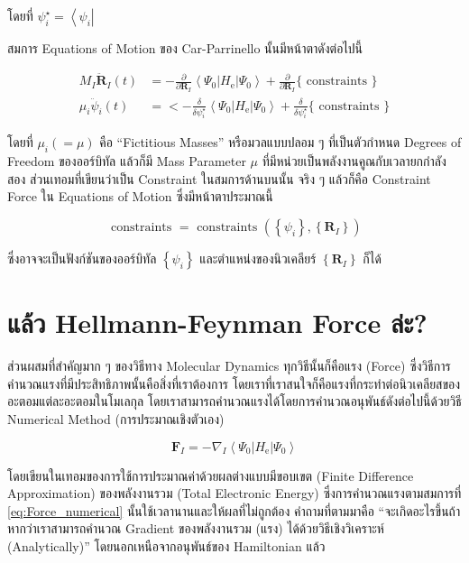 \noindent โดยที่ $\psi_i^{\star}=\left\langle\psi_i\right|$

สมการ Equations of Motion ของ Car-Parrinello นั้นมีหน้าตาดังต่อไปนี้


\begin{align}
  M_I \ddot{\mathbf{R}}_I(t)
   & =
  -\frac{\partial}{\partial \mathbf{R}_I}\left\langle\Psi_0\left| H_{\mathrm{e}}\right| \Psi_0\right\rangle
  +\frac{\partial}{\partial \mathbf{R}_I}\{\text{ constraints }\} \\
  \mu_i \ddot{\psi}_i(t)
   & =
  <-\frac{\delta}{\delta \psi_i^{\star}}\left\langle\Psi_0\left| H_{\mathrm{e}}\right| \Psi_0\right\rangle
  +\frac{\delta}{\delta \psi_i^{\star}}\{\text{ constraints }\}
\end{align}

\noindent โดยที่ $\mu_i(=\mu)$ คือ \enquote{Fictitious Masses} หรือมวลแบบปลอม ๆ ที่เป็นตัวกำหนด Degrees of Freedom
ของออร์บิทัล แล้วก็มี Mass Parameter $\mu$ ที่มีหน่วยเป็นพลังงานคูณกับเวลายกกำลังสอง ส่วนเทอมที่เขียนว่าเป็น Constraint ในสมการด้านบนนั้น
จริง ๆ แล้วก็คือ Constraint Force ใน Equations of Motion ซึ่งมีหน้าตาประมาณนี้

\begin{equation}
  \text{ constraints }
  =
  \text{ constraints }\left(\left\{\psi_i\right\},\left\{\mathbf{R}_I\right\}\right)
\end{equation}

\noindent ซึ่งอาจจะเป็นฟังก์ชันของออร์บิทัล $\left\{\psi_i\right\}$ และตำแหน่งของนิวเคลียร์ $\left\{\mathbf{R}_I\right\}$ ก็ได้

\section{แล้ว Hellmann-Feynman Force ล่ะ?}

ส่วนผสมที่สำคัญมาก ๆ ของวิธีทาง Molecular Dynamics ทุกวิธีนั้นก็คือแรง (Force) ซึ่งวิธีการคำนวณแรงที่มีประสิทธิภาพนั้นคือสิ่งที่เราต้องการ
โดยเราที่เราสนใจก็คือแรงที่กระทำต่อนิวเคลียสของอะตอมแต่ละอะตอมในโมเลกุล โดยเราสามารถคำนวณแรงได้โดยการคำนวณอนุพันธ์ดังต่อไปนี้ด้วยวิธี
Numerical Method (การประมาณเชิงตัวเอง)

\begin{equation}
  \label{eq:Force_numerical}
  \mathbf{F}_I
  =
  -\nabla_I\left\langle\Psi_0\left| H_{\mathrm{e}}\right| \Psi_0\right\rangle
\end{equation}

\noindent โดยเขียนในเทอมของการใช้การประมาณค่าด้วยผลต่างแบบมีขอบเขต (Finite Difference Approximation) ของพลังงานรวม
(Total Electronic Energy) ซึ่งการคำนวณแรงตามสมการที่ \eqref{eq:Force_numerical} นั้นใช้เวลานานและให้ผลที่ไม่ถูกต้อง
คำถามที่ตามมาคือ \enquote{จะเกิดอะไรขึ้นถ้าหากว่าเราสามารถคำนวณ Gradient ของพลังงานรวม (แรง) ได้ด้วยวิธีเชิงวิเคราะห์ (Analytically)}
โดยนอกเหนือจากอนุพันธ์ของ Hamiltonian แล้ว

